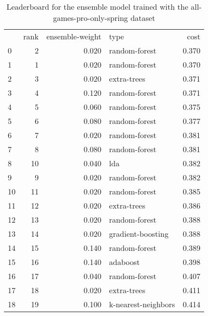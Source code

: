 \begin{table}[]
	\centering
	\begin{tabular}{lrrlr}
		   & rank & ensemble-weight & type                & cost  \\
		0  & 2    & 0.020           & random-forest       & 0.370 \\
		1  & 1    & 0.020           & random-forest       & 0.370 \\
		2  & 3    & 0.020           & extra-trees         & 0.371 \\
		3  & 4    & 0.120           & random-forest       & 0.371 \\
		4  & 5    & 0.060           & random-forest       & 0.375 \\
		5  & 6    & 0.080           & random-forest       & 0.377 \\
		6  & 7    & 0.020           & random-forest       & 0.381 \\
		7  & 8    & 0.080           & random-forest       & 0.381 \\
		8  & 10   & 0.040           & lda                 & 0.382 \\
		9  & 9    & 0.020           & random-forest       & 0.382 \\
		10 & 11   & 0.020           & random-forest       & 0.385 \\
		11 & 12   & 0.020           & extra-trees         & 0.386 \\
		12 & 13   & 0.020           & random-forest       & 0.388 \\
		13 & 14   & 0.020           & gradient-boosting   & 0.388 \\
		14 & 15   & 0.140           & random-forest       & 0.389 \\
		15 & 16   & 0.140           & adaboost            & 0.398 \\
		16 & 17   & 0.040           & random-forest       & 0.407 \\
		17 & 18   & 0.020           & extra-trees         & 0.411 \\
		18 & 19   & 0.100           & k-nearest-neighbors & 0.414 \\
	\end{tabular}

	\caption{Leaderboard for the ensemble model trained with the all-games-pro-only-spring dataset}
	\label{tab:lb-all-games-pro-only-spring-randsplit}
\end{table}

